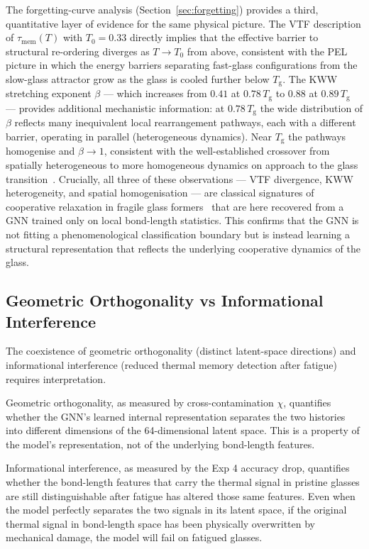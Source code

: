 \documentclass[12pt,a4paper]{article}
\newcommand{\Tg}{T_{\mathrm{g}}}
\newcommand{\xcontam}{\chi}
\newcommand{\vtau}{\tau_{\mathrm{mem}}}
\newcommand{\Tzero}{T_0}
\begin{document}
The forgetting-curve analysis (Section~\ref{sec:forgetting}) provides a third, quantitative layer of evidence for the same physical picture.
The VTF description of $\vtau(T)$ with $\Tzero = 0.33$ directly implies that the effective barrier to structural re-ordering diverges as $T \to \Tzero$ from above, consistent with the PEL picture in which the energy barriers separating fast-glass configurations from the slow-glass attractor grow as the glass is cooled further below $\Tg$.
The KWW stretching exponent $\beta$ — which increases from $0.41$ at $0.78\,\Tg$ to $0.88$ at $0.89\,\Tg$ — provides additional mechanistic information: at $0.78\,\Tg$ the wide distribution of $\beta$ reflects many inequivalent local rearrangement pathways, each with a different barrier, operating in parallel (heterogeneous dynamics).
Near $\Tg$ the pathways homogenise and $\beta \to 1$, consistent with the well-established crossover from spatially heterogeneous to more homogeneous dynamics on approach to the glass transition~\cite{Berthier2011,Angell1985}.
Crucially, all three of these observations — VTF divergence, KWW heterogeneity, and spatial homogenisation — are classical signatures of cooperative relaxation in fragile glass formers~\cite{Angell1985} that are here recovered from a GNN trained only on local bond-length statistics.
This confirms that the GNN is not fitting a phenomenological classification boundary but is instead learning a structural representation that reflects the underlying cooperative dynamics of the glass.

\subsection{Geometric Orthogonality vs Informational Interference}
\label{sec:orth-discussion}

The coexistence of geometric orthogonality (distinct latent-space directions) and informational interference (reduced thermal memory detection after fatigue) requires interpretation.

Geometric orthogonality, as measured by cross-contamination $\xcontam$, quantifies whether the GNN's learned internal representation separates the two histories into different dimensions of the 64-dimensional latent space.
This is a property of the model's representation, not of the underlying bond-length features.

Informational interference, as measured by the Exp 4 accuracy drop, quantifies whether the bond-length features that carry the thermal signal in pristine glasses are still distinguishable after fatigue has altered those same features.
Even when the model perfectly separates the two signals in its latent space, if the original thermal signal in bond-length space has been physically overwritten by mechanical damage, the model will fail on fatigued glasses.
\end{document}
